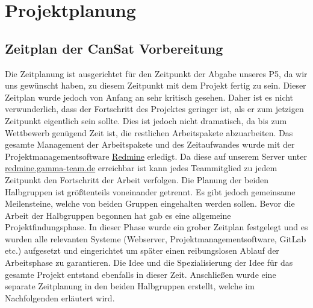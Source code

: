\section{Projektplanung}
\subsection{Zeitplan der CanSat Vorbereitung}
Die Zeitplanung ist ausgerichtet für den Zeitpunkt der Abgabe unseres P5, da wir uns gewünscht haben, zu diesem Zeitpunkt mit dem Projekt fertig zu sein. Dieser Zeitplan wurde jedoch von Anfang an sehr kritisch gesehen. Daher ist es nicht verwunderlich, dass der Fortschritt des Projektes geringer ist, als er zum jetzigen Zeitpunkt eigentlich sein sollte. Dies ist jedoch nicht dramatisch, da bis zum Wettbewerb genügend Zeit ist, die restlichen Arbeitspakete abzuarbeiten. Das gesamte Management der Arbeitspakete und des Zeitaufwandes wurde mit der Projektmanagementsoftware \href {www.redmine.org} {Redmine} erledigt. Da diese auf unserem Server unter \href{http://redmine.gamma-team.de}{redmine.gamma-team.de} erreichbar ist kann jedes Teammitglied zu jedem Zeitpunkt den Fortschritt der Arbeit verfolgen. Die Planung der beiden Halbgruppen ist größtenteils voneinander getrennt. Es gibt jedoch gemeinsame Meilensteine, welche von beiden Gruppen eingehalten werden sollen. Bevor die Arbeit der Halbgruppen begonnen hat gab es eine allgemeine Projektfindungsphase. In dieser Phase wurde ein grober Zeitplan festgelegt und es wurden alle relevanten Systeme (Webserver, Projektmanagementsoftware, GitLab etc.) aufgesetzt und eingerichtet um später einen reibungslosen Ablauf der Arbeitsphase zu garantieren. Die Idee und die Spezialisierung der Idee für das gesamte Projekt entstand ebenfalls in dieser Zeit. Anschließen wurde eine separate Zeitplanung in den beiden Halbgruppen erstellt, welche im Nachfolgenden erläutert wird.
